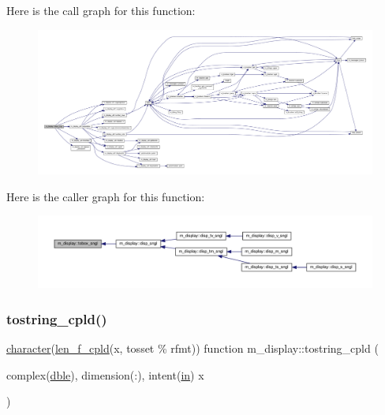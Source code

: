 Here is the call graph for this function\+:
\nopagebreak
\begin{figure}[H]
\begin{center}
\leavevmode
\includegraphics[width=350pt]{namespacem__display_a880ae5ed1f32412fadb1d1b91d406218_cgraph}
\end{center}
\end{figure}
Here is the caller graph for this function\+:
\nopagebreak
\begin{figure}[H]
\begin{center}
\leavevmode
\includegraphics[width=350pt]{namespacem__display_a880ae5ed1f32412fadb1d1b91d406218_icgraph}
\end{center}
\end{figure}
\mbox{\label{namespacem__display_a12b973ec5880a8f0d789fbdf433d177f}} 
\subsubsection{\texorpdfstring{tostring\+\_\+cpld()}{tostring\_cpld()}}
{\footnotesize\ttfamily \hyperlink{option__stopwatch_83_8txt_abd4b21fbbd175834027b5224bfe97e66}{character}(\hyperlink{namespacem__display_a803611d2a793f2a4aa7563b6c8295cb3}{len\+\_\+f\+\_\+cpld}(x, tosset \% rfmt)) function m\+\_\+display\+::tostring\+\_\+cpld (\begin{DoxyParamCaption}\item[{complex(\hyperlink{namespacem__display_a46d90b75b6ccef7ccade133e5847e815}{dble}), dimension(\+:), intent(\hyperlink{M__journal_83_8txt_afce72651d1eed785a2132bee863b2f38}{in})}]{x }\end{DoxyParamCaption})\hspace{0.3cm}{\ttfamily [private]}}



